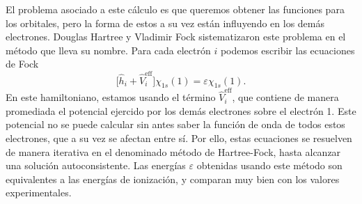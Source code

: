 \documentclass{tufte-handout}
\begin{document}
El problema asociado a este cálculo es que queremos
obtener las funciones para los orbitales, pero la forma
de estos a su vez están influyendo en los demás electrones. 
Douglas Hartree y Vladimir Fock sistematizaron este problema
en el método que lleva su nombre. 
Para cada electrón $i$ podemos escribir las ecuaciones de
Fock
\begin{equation}
    \bigg[\hat{h}_i+\hat{V}^\mathrm{eff}_i\bigg]\chi_{1s}(1)=
    \varepsilon\chi_{1s}(1).
\end{equation}
En este hamiltoniano, estamos usando el término $\hat{V}^\mathrm{eff}_i$,
que contiene de manera promediada el potencial ejercido por los 
demás electrones sobre el electrón 1. Este potencial 
no se puede calcular sin antes saber la función de onda de todos
estos electrones, que a su vez se afectan entre sí. Por ello, estas
ecuaciones se resuelven de manera iterativa en el denominado 
método de Hartree-Fock, hasta alcanzar una solución autoconsistente. 
Las energías $\varepsilon$ obtenidas usando este método son equivalentes
a las energías de ionización, y comparan muy bien con los valores
experimentales.

%
%
%

\end{document}

